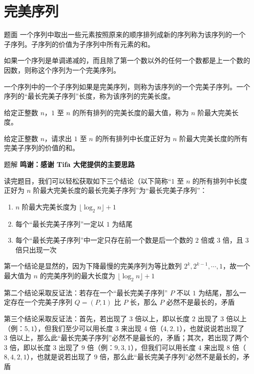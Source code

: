 \documentclass{pptt}
\begin{document}
\section{完美序列}

\begin{frame}{题面}
    一个序列中取出一些元素按照原来的顺序排列成新的序列称为该序列的一个子序列。子序列的价值为子序列中所有元素的和。

    如果一个序列是单调递减的，而且除了第一个数以外的任何一个数都是上一个数的因数，则称这个序列为一个完美序列。

    一个序列中的一个子序列如果是完美序列，则称为该序列的一个完美子序列。一个序列的“最长完美子序列”长度，称为该序列的完美长度。

    给定正整数 $n$，$1$ 至 $n$ 的所有排列的完美长度的最大值，称为 $n$ 阶最大完美长度。

    给定正整数 $n$，请求出 $1$ 至 $n$ 的所有排列中长度正好为 $n$ 阶最大完美长度的所有完美子序列的价值的和。
\end{frame}

\begin{frame}{题解}
    \textbf{鸣谢：感谢 Tifa 大佬提供的主要思路}

    \vspace{1cm}
    读完题目，我们可以轻松获取如下三个结论（以下简称“$1$ 至 $n$ 的所有排列中长度正好为 $n$ 阶最大完美长度的最长完美子序列”为“最长完美子序列”：

    \begin{enumerate}
        \item $n$ 阶最大完美长度为 $\lfloor \log_2 n \rfloor + 1$
        \item 每个“最长完美子序列”一定以 $1$ 为结尾
        \item 每个“最长完美子序列”中一定只存在前一个数是后一个数的 $2$ 倍或 $3$ 倍，且 $3$ 倍只出现一次
    \end{enumerate}
\end{frame}

\begin{frame}
    第一个结论是显然的，因为下降最慢的完美序列为等比数列 $2^k,2^{k-1},\cdots,1$，故一个最大值为 $n$ 的完美序列的最大长度为 $\lfloor \log_2 n \rfloor + 1$

    第二个结论采取反证法：若存在一个“最长完美子序列” $P$ 不以 $1$ 为结尾，那么一定存在一个完美子序列 $Q=(P,1)$ 比 $P$ 长，那么 $P$ 必然不是最长的，矛盾

    第三个结论采取反证法：首先，若出现了 $3$ 倍以上，即以长度 $2$ 出现了 $3$ 倍以上（例：$5,1$），但我们至少可以用长度 $3$ 来出现 $4$ 倍（$4,2,1$），也就说说若出现了 $3$ 倍以上，那么此“最长完美子序列”必然不是最长的，矛盾；其次，若出现了两个 $3$ 倍，即以长度 $3$ 出现了 $9$ 倍（例：$9,3,1$），但我们可以用长度 $4$ 来出现 $8$ 倍（$8,4,2,1$），也就是说若出现了 $9$ 倍，那么此“最长完美子序列”必然不是最长的，矛盾
\end{frame}
\end{document}
